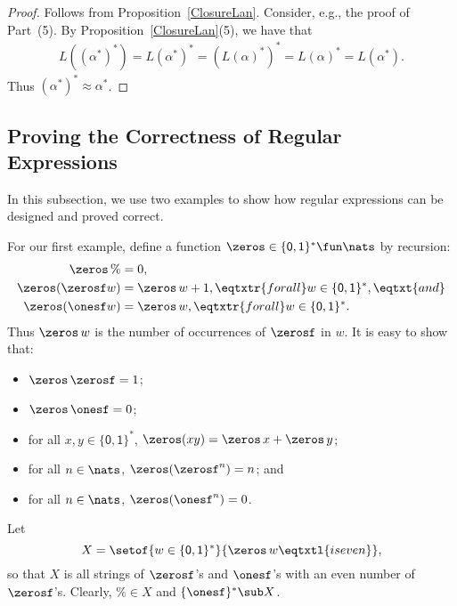 \begin{proof}
Follows from Proposition~\ref{ClosureLan}.  Consider, e.g., the proof
of Part~(5).  By Proposition~\ref{ClosureLan}(5), we have that
\begin{gather*}
L((\alpha^*)^*) = L(\alpha^*)^* = (L(\alpha)^*)^* = L(\alpha)^* =
L(\alpha^*) .
\end{gather*}
Thus $(\alpha^*)^* \approx \alpha^*$.
\end{proof}
%

\subsection{Proving the Correctness of Regular Expressions}
\label{ProvingTheCorrectnessOfRegularExpressions}

%
%
In this subsection, we use two examples to show how regular
expressions can be designed and proved correct.

For our first example, define a function
$\zeros\in\{\mathsf{0,1}\}^*\fun\nats$ by recursion:
\begin{align*}
\zeros\,\% &= 0 , \\
\zeros(\zerosf w) &= \zeros\,w + 1,
\eqtxtr{for all} w\in\{\mathsf{0,1}\}^* , \eqtxt{and}\\
\zeros(\onesf w) &= \zeros\,w, \eqtxtr{for all} w\in\{\mathsf{0,1}\}^* .
\end{align*}
Thus $\zeros\,w$ is the number of occurrences of $\zerosf$ in $w$.
It is easy to show that:
\begin{itemize}
\item $\zeros\,\zerosf = 1$;

\item $\zeros\,\onesf = 0$;

\item for all $x,y\in\{\mathsf{0,1}\}^*$, $\zeros(xy) = \zeros\,x +
\zeros\,y$;

\item for all $n\in\nats$, $\zeros(\zerosf^n) = n$; and

\item for all $n\in\nats$, $\zeros(\onesf^n) = 0$.
\end{itemize}
Let
\begin{displaymath}
X=\setof{w\in\{\mathsf{0,1}\}^*}{\zeros\,w\eqtxtl{is even}} ,
\end{displaymath}
so that $X$ is all strings of $\zerosf$'s and $\onesf$'s with an even
number of $\zerosf$'s.  Clearly, $\%\in X$ and $\{\onesf\}^*\sub X$.

